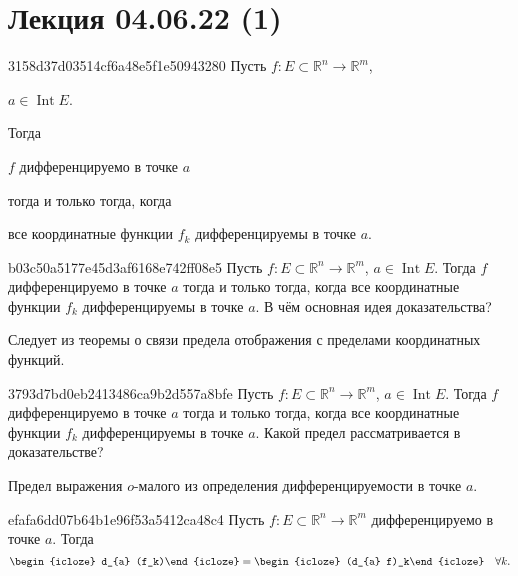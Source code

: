 \section{Лекция 04.06.22 (1)}
\begin{note}{3158d37d03514cf6a48e5f1e50943280}
    Пусть \({ f : E \subset \mathbb R^{n} \to \mathbb R^{m} }\),\: \begin{icloze}{4}\({ a \in \operatorname{Int} E }\).\end{icloze}
    Тогда \begin{icloze}{2}\({ f }\) дифференцируемо в точке \({ a }\)\end{icloze} \begin{icloze}{3}тогда и только тогда, когда\end{icloze} \begin{icloze}{1}все координатные функции \({ f_k }\) дифференцируемы в точке \({ a }\).\end{icloze}
\end{note}

\begin{note}{b03c50a5177e45d3af6168e742ff08e5}
    Пусть \({ f : E \subset \mathbb R^{n} \to \mathbb R^{m} }\),\: \({ a \in \operatorname{Int} E }\).
    Тогда \({ f }\) дифференцируемо в точке \({ a }\) тогда и только тогда, когда все координатные функции \({ f_k }\) дифференцируемы в точке \({ a }\).
    В чём основная идея доказательства?

    \begin{cloze}{1}
        Следует из теоремы о связи предела отображения с пределами координатных функций.
    \end{cloze}
\end{note}

\begin{note}{3793d7bd0eb2413486ca9b2d557a8bfe}
    Пусть \({ f : E \subset \mathbb R^{n} \to \mathbb R^{m} }\),\: \({ a \in \operatorname{Int} E }\).
    Тогда \({ f }\) дифференцируемо в точке \({ a }\) тогда и только тогда, когда все координатные функции \({ f_k }\) дифференцируемы в точке \({ a }\).
    Какой предел рассматривается в доказательстве?

    \begin{cloze}{1}
        Предел выражения \({ o }\)-малого из определения дифференцируемости в точке \({ a }\).
    \end{cloze}
\end{note}

\begin{note}{efafa6dd07b64b1e96f53a5412ca48c4}
    Пусть \({ f : E \subset \mathbb R^{n} \to \mathbb R^{m} }\) дифференцируемо в точке \({ a }\).
    Тогда
    \[
        \begin{icloze}{2}d_{a} (f_k)\end{icloze} = \begin{icloze}{1}(d_{a} f)_k\end{icloze} \quad \forall k.
    \]
\end{note}

